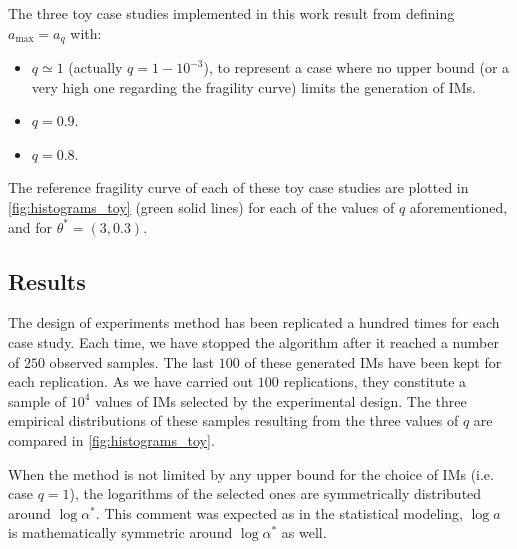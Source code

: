     The three toy case studies implemented in this work result from defining $a_{\text{max}}=a_q$ with:
    \begin{itemize}
        \item $q\simeq1$ (actually $q=1-10^{-3}$), to represent a case where no upper bound (or a very high one regarding the fragility curve) limits the generation of IMs. %
        \item $q=0.9$.
        \item $q=0.8$.
    \end{itemize}
    The reference fragility curve of each of these toy case studies are plotted in  \cref{fig:histograms_toy} (green solid lines) for each of the values of $q$ aforementioned, and for $\theta^\ast=(3,0.3)$. 
    
    
    
    
    
    \subsection{Results}
    
    The design of experiments method has been replicated a hundred times for each case study. Each time, we have stopped the algorithm after it reached a number of $250$ observed samples.
    The last $100$ of these generated IMs have been kept for each replication. As we have carried out $100$ replications, they constitute a sample of $10^4$ values of IMs selected by the experimental design.
    The three empirical distributions of these samples resulting from the three values of $q$ are compared in  \cref{fig:histograms_toy}.
    
    
    When the method is not limited by any upper bound for the choice of IMs (i.e. case $q=1$), 
    the logarithms of the selected ones are symmetrically distributed around $\log\alpha^\ast$. This comment was expected as in the statistical modeling, $\log a$ is mathematically symmetric around $\log\alpha^\ast$ as well.
    
